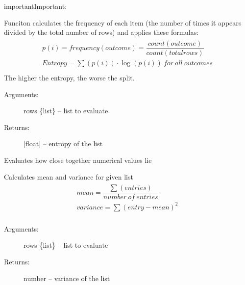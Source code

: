 \documentclass[letterpaper,10pt,english]{sphinxmanual}
\begin{document}
\begin{sphinxadmonition}{important}{Important:}
\begin{fulllineitems}
Funciton calculates the frequency of each item (the number of times it appears divided by the total number of rows)
and applies these formulas:
\begin{align*}\!\begin{aligned}
p(i) = frequency(outcome) = \dfrac{count(outcome)}{count(total rows)}\\
Entropy = \sum(p(i)) \cdot  \log(p(i)) \ for \ all \ outcomes\\
\end{aligned}\end{align*}
The higher the entropy, the worse the split.
\begin{description}
\item[{Arguments:}] \leavevmode
rows \{list\} -- list to evaluate

\item[{Returns:}] \leavevmode
{[}float{]} -- entropy of the list

\end{description}

\end{fulllineitems}

\label{\detokenize{DT:variance}}

\begin{fulllineitems}
\label{\detokenize{DT:ForestFire.Main.variance}}
Evaluates how close together numerical values lie

Calculates mean and variance for given list
\begin{align*}\!\begin{aligned}
mean = \dfrac{\sum(entries)}{number \ of \ entries}\\
variance = \sum(entry - mean) ^ 2\\
\end{aligned}\end{align*}\begin{description}
\item[{Arguments:}] \leavevmode
rows \{list\} -- list to evaluate

\item[{Returns:}] \leavevmode
number -- variance of the list

\end{description}

\end{fulllineitems}

\label{\detokenize{DT:uniquecounts}}


\end{sphinxadmonition}
\end{document}
